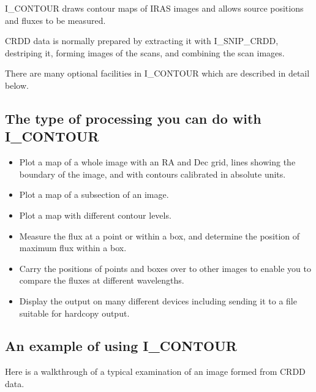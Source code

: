 \documentclass[nolof,noabs,11pt]{starlink}
\begin{document}
I\_CONTOUR draws contour maps of IRAS images and allows source positions and
fluxes to be measured.

CRDD data is normally prepared by extracting it with I\_SNIP\_CRDD, destriping
it, forming images of the scans, and combining the scan images.


There are many optional facilities in I\_CONTOUR which are described in detail
below.

\subsection{The type of processing you can do with I\_CONTOUR}

\begin{itemize}

\item Plot a map of a whole image with an RA and Dec grid, lines showing the
boundary of the image, and with contours calibrated in absolute units.

\item Plot a map of a subsection of an image.

\item Plot a map with different contour levels.

\item Measure the flux at a point or within a box, and determine the position of
maximum flux within a box.

\item Carry the positions of points and boxes over to other images to enable
you to compare the fluxes at different wavelengths.

\item Display the output on many different devices including sending it to a
file suitable for hardcopy output.
\end{itemize}

\subsection{An example of using I\_CONTOUR}

Here is a walkthrough of a typical examination of an image formed from CRDD
data.
\end{document}
